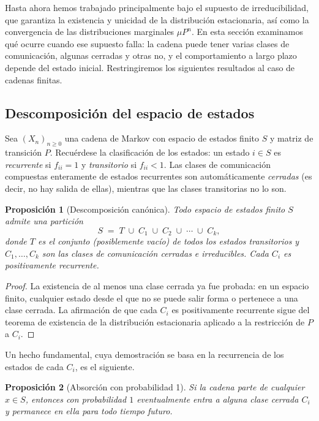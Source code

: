 \documentclass[12pt]{book}
\newtheorem{proposition}{Proposición}[chapter]
\begin{document}
Hasta ahora hemos trabajado principalmente bajo el supuesto de irreducibilidad, que garantiza la existencia y unicidad de la distribución estacionaria, así como la convergencia de las distribuciones marginales $\mu P^n$. En esta sección examinamos qué ocurre cuando ese supuesto falla: la cadena puede tener varias clases de comunicación, algunas cerradas y otras no, y el comportamiento a largo plazo depende del estado inicial. Restringiremos los siguientes resultados al caso de cadenas finitas.

\subsection{Descomposición del espacio de estados}

Sea $(X_n)_{n\geq 0}$ una cadena de Markov con espacio de estados finito $S$ y matriz de transición $P$. Recuérdese la clasificación de los estados: un estado $i\in S$ es \emph{recurrente} si $f_{ii}=1$ y \emph{transitorio} si $f_{ii}<1$. Las clases de comunicación compuestas enteramente de estados recurrentes son automáticamente \emph{cerradas} (es decir, no hay salida de ellas), mientras que las clases transitorias no lo son.

\begin{proposition}[Descomposición canónica]
    Todo espacio de estados finito $S$ admite una partición
    \[
        S \;=\; T \;\cup\; C_1 \;\cup\; C_2 \;\cup\; \cdots \;\cup\; C_k,
    \]
    donde $T$ es el conjunto (posiblemente vacío) de todos los estados transitorios y $C_1, \dots, C_k$ son las clases de comunicación cerradas e irreducibles. Cada $C_i$ es positivamente recurrente.
\end{proposition}

\begin{proof}
    La existencia de al menos una clase cerrada ya fue probada: en un espacio finito, cualquier estado desde el que no se puede salir forma o pertenece a una clase cerrada. La afirmación de que cada $C_i$ es positivamente recurrente sigue del teorema de existencia de la distribución estacionaria aplicado a la restricción de $P$ a $C_i$.
\end{proof}

Un hecho fundamental, cuya demostración se basa en la recurrencia de los estados de cada $C_i$, es el siguiente.

\begin{proposition}[Absorción con probabilidad 1]
    Si la cadena parte de cualquier $x \in S$, entonces con probabilidad $1$ eventualmente entra a alguna clase cerrada $C_i$ y permanece en ella para todo tiempo futuro.
\end{proposition}
\end{document}
